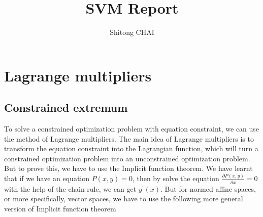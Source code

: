 \documentclass[a4paper]{report}
\title{SVM Report}
\date{}
\author{Shitong CHAI}
\begin{document}
\maketitle
\tableofcontents

\chapter{Lagrange multipliers}

\section{Constrained extremum}

To solve a constrained optimization problem with equation constraint, we can use the method of Lagrange multipliers. The main idea of Lagrange multipliers is to transform the equation constraint into the Lagrangian function, which will turn a constrained optimization problem into an unconstrained optimization problem. But to prove this, we have to use the Implicit function theorem. We have learnt that if we have an equation $P(x,y)=0$, then by solve the equation $\frac{\partial P(x,y)}{\partial x}=0$
with the help of the chain rule, we can get $y^\prime (x)$. But for normed affine spaces, or more specifically, vector spaces, we have to use the following more general version of Implicit function theorem
\end{document}
